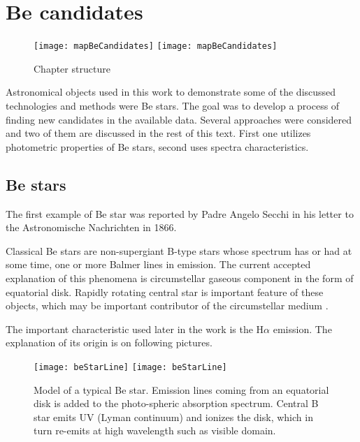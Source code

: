 \chapter{Be candidates}

\begin{figure}[!htbp]
  \begin{center}
    \leavevmode
    \ifpdf
    \texttt{[image: mapBeCandidates]}
    \else
    \texttt{[image: mapBeCandidates]} 
    \fi
    \caption{Chapter structure}
    \label{FigStructure}
  \end{center}
\end{figure}


Astronomical objects used in this work to demonstrate some of the
discussed technologies and methods were Be stars. The goal was to
develop a process of finding new candidates in the available
data. Several approaches were considered and two of them are discussed
in the rest of this text. First one utilizes photometric properties of
Be stars, second uses spectra characteristics.


\section{Be stars}

The first example of Be star was reported by Padre Angelo Secchi in
his letter to the Astronomische Nachrichten in 1866.

Classical Be stars are non-supergiant B-type stars whose spectrum has
or had at some time, one or more Balmer lines in emission. The current
accepted explanation of this phenomena is circumstellar gaseous
component in the form of equatorial disk. Rapidly rotating central
star is important feature of these objects, which may be important
contributor of the circumstellar medium \cite{porter2003classical}.

The important characteristic used later in the work is the H$\alpha$
emission. The explanation of its origin is on following pictures.


    \begin{figure}[!htbp]
      \begin{center}
        \leavevmode
        \ifpdf
        \texttt{[image: beStarLine]}
        \else
        \texttt{[image: beStarLine]}
        \fi
        \caption{Model of a typical Be star. Emission lines coming
          from an equatorial disk is added to the photo-spheric
          absorption spectrum. Central B star emits UV (Lyman
          continuum) and ionizes the disk, which in turn re-emits at
          high wavelength such as visible
          domain. \cite{hirata1984star}}
        \label{Figjhk_be_b}
      \end{center}
    \end{figure}


